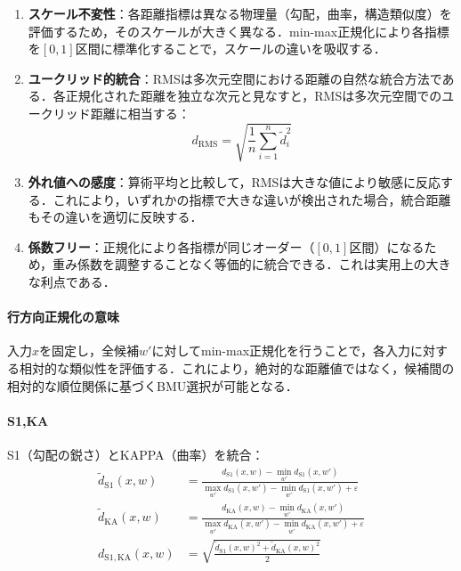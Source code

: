 \documentclass{jarticle}
\theoremstyle{definition}
\begin{document}
\begin{enumerate}
\item \textbf{スケール不変性}：各距離指標は異なる物理量（勾配，曲率，構造類似度）を評価するため，そのスケールが大きく異なる．min-max正規化により各指標を$[0,1]$区間に標準化することで，スケールの違いを吸収する．

\item \textbf{ユークリッド的統合}：RMSは多次元空間における距離の自然な統合方法である．各正規化された距離を独立な次元と見なすと，RMSは多次元空間でのユークリッド距離に相当する：
\begin{equation}
d_{\text{RMS}} = \sqrt{\frac{1}{n}\sum_{i=1}^{n} \tilde{d}_i^2}
\end{equation}

\item \textbf{外れ値への感度}：算術平均と比較して，RMSは大きな値により敏感に反応する．これにより，いずれかの指標で大きな違いが検出された場合，統合距離もその違いを適切に反映する．

\item \textbf{係数フリー}：正規化により各指標が同じオーダー（$[0,1]$区間）になるため，重み係数を調整することなく等価的に統合できる．これは実用上の大きな利点である．
\end{enumerate}

\paragraph{行方向正規化の意味}
入力$x$を固定し，全候補$w'$に対してmin-max正規化を行うことで，各入力に対する相対的な類似性を評価する．これにより，絶対的な距離値ではなく，候補間の相対的な順位関係に基づくBMU選択が可能となる．

\paragraph{S1,KA}
S1（勾配の鋭さ）とKAPPA（曲率）を統合：
\begin{align}
\tilde d_{\mathrm{S1}}(x,w)&=\frac{d_{\mathrm{S1}}(x,w)-\min_{w'}d_{\mathrm{S1}}(x,w')}{\max_{w'}d_{\mathrm{S1}}(x,w')-\min_{w'}d_{\mathrm{S1}}(x,w')+\varepsilon}\\
\tilde d_{\mathrm{KA}}(x,w)&=\frac{d_{\mathrm{KA}}(x,w)-\min_{w'}d_{\mathrm{KA}}(x,w')}{\max_{w'}d_{\mathrm{KA}}(x,w')-\min_{w'}d_{\mathrm{KA}}(x,w')+\varepsilon}\\
d_{\mathrm{S1,KA}}(x,w)&=\sqrt{\frac{\tilde d_{\mathrm{S1}}(x,w)^2+\tilde d_{\mathrm{KA}}(x,w)^2}{2}}
\end{align}
\end{document}
